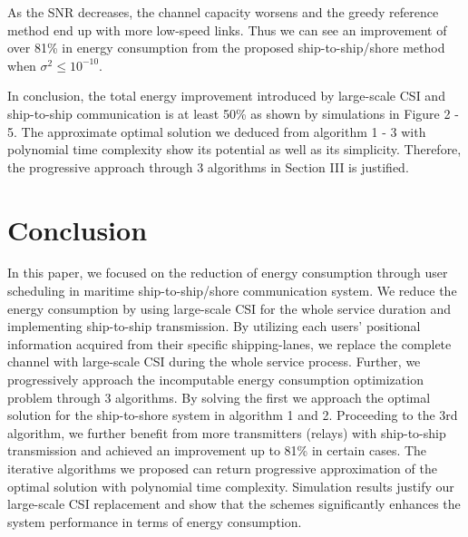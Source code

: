 \documentclass[conference]{IEEEtran}
\begin{document}

As the SNR decreases, the channel capacity worsens and the greedy reference method end up with more low-speed links. Thus we can see an improvement of over 81\% in energy consumption from the proposed ship-to-ship/shore method when ${\sigma ^2 \le{10^{ - 10}}}$.

In conclusion, the total energy improvement introduced by large-scale CSI and ship-to-ship communication is at least 50\% as shown by simulations in Figure 2 - 5. The approximate optimal solution we deduced from algorithm 1 - 3 with polynomial time complexity show its potential as well as its simplicity. Therefore, the progressive approach through 3 algorithms in Section III is justified. 

\section{Conclusion}\label{sec:5}

In this paper, we focused on the reduction of energy consumption through user scheduling in maritime ship-to-ship/shore communication system. 
We reduce the energy consumption by using large-scale CSI for the whole service duration and implementing ship-to-ship transmission. 
By utilizing each users' positional information acquired from their specific shipping-lanes, we replace the complete channel with large-scale CSI during the whole service process. Further, we progressively approach the incomputable energy consumption optimization problem through 3 algorithms. By solving the first we approach the optimal solution for the ship-to-shore system in algorithm 1 and 2. %
Proceeding to the 3rd algorithm, we further benefit from more transmitters (relays) with ship-to-ship transmission and achieved an improvement up to 81\% in certain cases. %
The iterative algorithms we proposed can return progressive approximation of the optimal solution with polynomial time complexity. Simulation results justify our large-scale CSI replacement and show that the schemes significantly enhances the system performance in terms of energy consumption.
\end{document}
